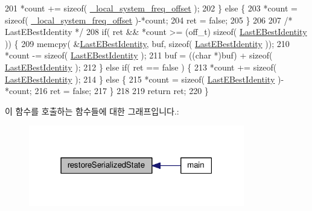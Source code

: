 \begin{DoxyCode}
201         *count += \textcolor{keyword}{sizeof}( \hyperlink{class_i_e_e_e1588_clock_ad28017a023b91ce56dba976677a7ce1a}{\_local\_system\_freq\_offset} );
202     \} \textcolor{keywordflow}{else} \{
203         *count = \textcolor{keyword}{sizeof}( \hyperlink{class_i_e_e_e1588_clock_ad28017a023b91ce56dba976677a7ce1a}{\_local\_system\_freq\_offset} )-*count;
204         ret = \textcolor{keyword}{false};
205     \}
206 
207     \textcolor{comment}{/* LastEBestIdentity */}
208   \textcolor{keywordflow}{if}( ret && *count >= (off\_t) \textcolor{keyword}{sizeof}( \hyperlink{class_i_e_e_e1588_clock_aecec9d272ce3010f56716cdaf7bd1e5c}{LastEBestIdentity} )) \{
209       memcpy( &\hyperlink{class_i_e_e_e1588_clock_aecec9d272ce3010f56716cdaf7bd1e5c}{LastEBestIdentity}, buf, \textcolor{keyword}{sizeof}( 
      \hyperlink{class_i_e_e_e1588_clock_aecec9d272ce3010f56716cdaf7bd1e5c}{LastEBestIdentity} ));
210       *count -= \textcolor{keyword}{sizeof}( \hyperlink{class_i_e_e_e1588_clock_aecec9d272ce3010f56716cdaf7bd1e5c}{LastEBestIdentity} );
211       buf = ((\textcolor{keywordtype}{char} *)buf) + \textcolor{keyword}{sizeof}( \hyperlink{class_i_e_e_e1588_clock_aecec9d272ce3010f56716cdaf7bd1e5c}{LastEBestIdentity} );
212   \} \textcolor{keywordflow}{else} \textcolor{keywordflow}{if}( ret == \textcolor{keyword}{false} ) \{
213       *count += \textcolor{keyword}{sizeof}( \hyperlink{class_i_e_e_e1588_clock_aecec9d272ce3010f56716cdaf7bd1e5c}{LastEBestIdentity} );
214   \} \textcolor{keywordflow}{else} \{
215       *count = \textcolor{keyword}{sizeof}( \hyperlink{class_i_e_e_e1588_clock_aecec9d272ce3010f56716cdaf7bd1e5c}{LastEBestIdentity} )-*count;
216       ret = \textcolor{keyword}{false};
217   \}
218 
219   \textcolor{keywordflow}{return} ret;
220 \}
\end{DoxyCode}


이 함수를 호출하는 함수들에 대한 그래프입니다.\+:
\nopagebreak
\begin{figure}[H]
\begin{center}
\leavevmode
\includegraphics[width=267pt]{class_i_e_e_e1588_clock_a383669aeae1b1eeaa021267a0041d163_icgraph}
\end{center}
\end{figure}


